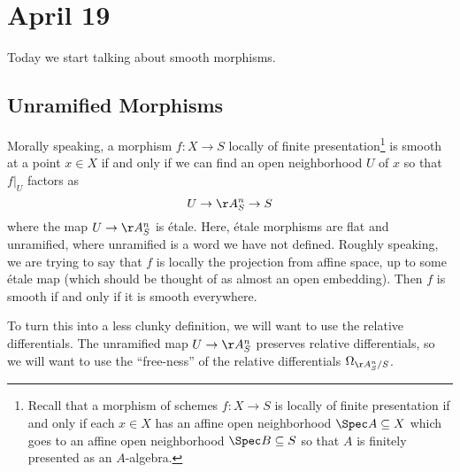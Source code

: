 \documentclass[../notes.tex]{subfiles}
\begin{document}
\section{April 19}

Today we start talking about smooth morphisms.

\subsection{Unramified Morphisms}
Morally speaking, a morphism $f\colon X\to S$ locally of finite presentation\footnote{Recall that a morphism of schemes $f\colon X\to S$ is locally of finite presentation if and only if each $x\in X$ has an affine open neighborhood $\Spec A\subseteq X$ which goes to an affine open neighborhood $\Spec B\subseteq S$ so that $A$ is finitely presented as an $A$-algebra.} is smooth at a point $x\in X$ if and only if we can find an open neighborhood $U$ of $x$ so that $f|_U$ factors as
\[U\to\AA^n_S\to S\]
where the map $U\to\AA^n_S$ is \'etale. Here, \'etale morphisms are flat and unramified, where unramified is a word we have not defined. Roughly speaking, we are trying to say that $f$ is locally the projection from affine space, up to some \'etale map (which should be thought of as almost an open embedding). Then $f$ is smooth if and only if it is smooth everywhere.

To turn this into a less clunky definition, we will want to use the relative differentials. The unramified map $U\to\AA^n_S$ preserves relative differentials, so we will want to use the ``free-ness'' of the relative differentials $\Omega_{\AA^n_S/S}$.
\end{document}
